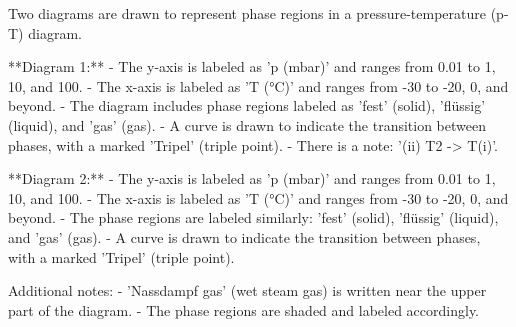 Two diagrams are drawn to represent phase regions in a pressure-temperature (p-T) diagram.  

**Diagram 1:**  
- The y-axis is labeled as 'p (mbar)' and ranges from 0.01 to 1, 10, and 100.  
- The x-axis is labeled as 'T (°C)' and ranges from -30 to -20, 0, and beyond.  
- The diagram includes phase regions labeled as 'fest' (solid), 'flüssig' (liquid), and 'gas' (gas).  
- A curve is drawn to indicate the transition between phases, with a marked 'Tripel' (triple point).  
- There is a note: '(ii) T2 -> T(i)'.  

**Diagram 2:**  
- The y-axis is labeled as 'p (mbar)' and ranges from 0.01 to 1, 10, and 100.  
- The x-axis is labeled as 'T (°C)' and ranges from -30 to -20, 0, and beyond.  
- The phase regions are labeled similarly: 'fest' (solid), 'flüssig' (liquid), and 'gas' (gas).  
- A curve is drawn to indicate the transition between phases, with a marked 'Tripel' (triple point).  

Additional notes:  
- 'Nassdampf gas' (wet steam gas) is written near the upper part of the diagram.  
- The phase regions are shaded and labeled accordingly.